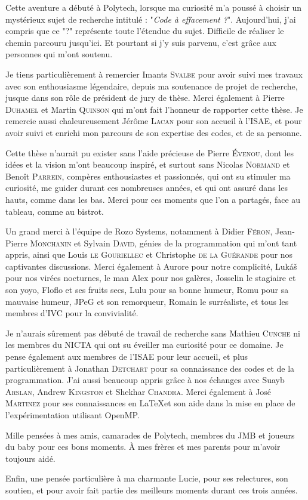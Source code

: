 
Cette aventure a débuté à Polytech, lorsque ma curiosité m'a poussé à choisir
un mystérieux sujet de recherche intitulé : "\emph{Code à effacement ?}".
Aujourd'hui, j'ai compris que ce "?" représente toute l'étendue du sujet.
Difficile de réaliser le chemin parcouru jusqu'ici. Et pourtant si j'y suis
parvenu, c'est grâce aux personnes qui m'ont soutenu.

Je tiens particulièrement à remercier Imants \textsc{Svalbe} pour avoir suivi
mes travaux avec son enthousiasme légendaire, depuis ma soutenance de projet de
recherche, jusque dans son rôle de président de jury de thèse.
Merci également à Pierre \textsc{Duhamel} et Martin \textsc{Quinson} qui m'ont
fait l'honneur de rapporter cette thèse.
Je remercie aussi chaleureusement Jérôme \textsc{Lacan} pour son accueil à
l'ISAE, et pour avoir suivi et enrichi mon parcours de son expertise des codes,
et de sa personne.

Cette thèse n'aurait pu exister sans l'aide précieuse de Pierre
\textsc{Évenou}, dont les idées et la vision m'ont beaucoup inspiré, et
surtout sans Nicolas \textsc{Normand} et Benoît \textsc{Parrein}, compères
enthousiastes et passionnés, qui ont su stimuler ma curiosité, me guider durant
ces nombreuses années, et qui ont assuré dans les hauts, comme dans les bas.
Merci pour ces moments que l'on a partagés, face au tableau, comme au bistrot.

Un grand merci à l'équipe de Rozo Systems, notamment à Didier \textsc{Féron},
Jean-Pierre \textsc{Monchanin} et Sylvain \textsc{David}, génies de la
programmation qui m'ont tant appris, ainsi que Louis \textsc{le Gouriellec} et
Christophe \textsc{de la Guérande} pour nos captivantes discussions.
Merci également à Aurore pour notre complicité, Lukáš pour nos virées
nocturnes, le man Alex pour nos galères, Josselin le stagiaire et son
yoyo, Floflo et ses fruits secs, Lulu pour sa bonne humeur, Romu pour sa
mauvaise humeur, JPeG et son remorqueur, Romain le surréaliste, et tous les
membres d'IVC pour la convivialité.

Je n'aurais sûrement pas débuté de travail de recherche sans Mathieu
\textsc{Cunche} ni les membres du NICTA qui ont su éveiller ma curiosité pour
ce domaine.
Je pense également aux membres de l'ISAE pour leur accueil, et plus
particulièrement à Jonathan \textsc{Detchart} pour sa connaissance des codes et
de la programmation. J'ai aussi beaucoup appris grâce à nos échanges avec Suayb
\textsc{Arslan}, Andrew \textsc{Kingston} et Shekhar \textsc{Chandra}. Merci
également à José \textsc{Martinez} pour ses connaissances en \LaTeX et son aide
dans la mise en place de l'expérimentation utilisant OpenMP.

Mille pensées à mes amis, camarades de Polytech, membres du JMB et joueurs du
baby pour ces bons moments. À mes frères et mes parents pour m'avoir toujours
aidé.

Enfin, une pensée particulière à ma charmante Lucie, pour ses relectures, son
soutien, et pour avoir fait partie des meilleurs moments durant ces trois
années.

